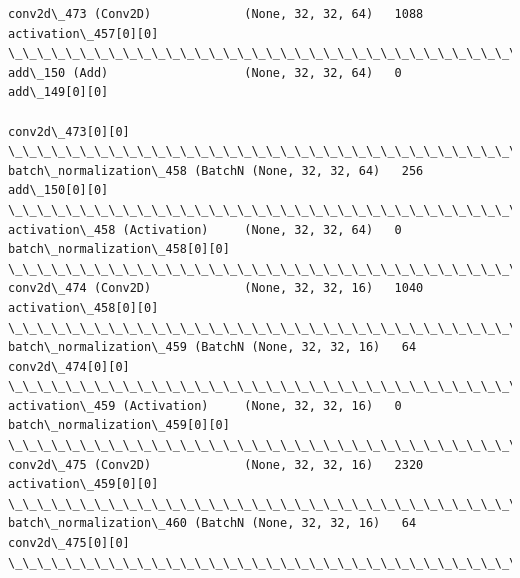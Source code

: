 \documentclass[11pt]{article}
\begin{document}
\begin{Verbatim}[commandchars=\\\{\}]
conv2d\_473 (Conv2D)             (None, 32, 32, 64)   1088        activation\_457[0][0]             
\_\_\_\_\_\_\_\_\_\_\_\_\_\_\_\_\_\_\_\_\_\_\_\_\_\_\_\_\_\_\_\_\_\_\_\_\_\_\_\_\_\_\_\_\_\_\_\_\_\_\_\_\_\_\_\_\_\_\_\_\_\_\_\_\_\_\_\_\_\_\_\_\_\_\_\_\_\_\_\_\_\_\_\_\_\_\_\_\_\_\_\_\_\_\_\_\_\_
add\_150 (Add)                   (None, 32, 32, 64)   0           add\_149[0][0]                    
                                                                 conv2d\_473[0][0]                 
\_\_\_\_\_\_\_\_\_\_\_\_\_\_\_\_\_\_\_\_\_\_\_\_\_\_\_\_\_\_\_\_\_\_\_\_\_\_\_\_\_\_\_\_\_\_\_\_\_\_\_\_\_\_\_\_\_\_\_\_\_\_\_\_\_\_\_\_\_\_\_\_\_\_\_\_\_\_\_\_\_\_\_\_\_\_\_\_\_\_\_\_\_\_\_\_\_\_
batch\_normalization\_458 (BatchN (None, 32, 32, 64)   256         add\_150[0][0]                    
\_\_\_\_\_\_\_\_\_\_\_\_\_\_\_\_\_\_\_\_\_\_\_\_\_\_\_\_\_\_\_\_\_\_\_\_\_\_\_\_\_\_\_\_\_\_\_\_\_\_\_\_\_\_\_\_\_\_\_\_\_\_\_\_\_\_\_\_\_\_\_\_\_\_\_\_\_\_\_\_\_\_\_\_\_\_\_\_\_\_\_\_\_\_\_\_\_\_
activation\_458 (Activation)     (None, 32, 32, 64)   0           batch\_normalization\_458[0][0]    
\_\_\_\_\_\_\_\_\_\_\_\_\_\_\_\_\_\_\_\_\_\_\_\_\_\_\_\_\_\_\_\_\_\_\_\_\_\_\_\_\_\_\_\_\_\_\_\_\_\_\_\_\_\_\_\_\_\_\_\_\_\_\_\_\_\_\_\_\_\_\_\_\_\_\_\_\_\_\_\_\_\_\_\_\_\_\_\_\_\_\_\_\_\_\_\_\_\_
conv2d\_474 (Conv2D)             (None, 32, 32, 16)   1040        activation\_458[0][0]             
\_\_\_\_\_\_\_\_\_\_\_\_\_\_\_\_\_\_\_\_\_\_\_\_\_\_\_\_\_\_\_\_\_\_\_\_\_\_\_\_\_\_\_\_\_\_\_\_\_\_\_\_\_\_\_\_\_\_\_\_\_\_\_\_\_\_\_\_\_\_\_\_\_\_\_\_\_\_\_\_\_\_\_\_\_\_\_\_\_\_\_\_\_\_\_\_\_\_
batch\_normalization\_459 (BatchN (None, 32, 32, 16)   64          conv2d\_474[0][0]                 
\_\_\_\_\_\_\_\_\_\_\_\_\_\_\_\_\_\_\_\_\_\_\_\_\_\_\_\_\_\_\_\_\_\_\_\_\_\_\_\_\_\_\_\_\_\_\_\_\_\_\_\_\_\_\_\_\_\_\_\_\_\_\_\_\_\_\_\_\_\_\_\_\_\_\_\_\_\_\_\_\_\_\_\_\_\_\_\_\_\_\_\_\_\_\_\_\_\_
activation\_459 (Activation)     (None, 32, 32, 16)   0           batch\_normalization\_459[0][0]    
\_\_\_\_\_\_\_\_\_\_\_\_\_\_\_\_\_\_\_\_\_\_\_\_\_\_\_\_\_\_\_\_\_\_\_\_\_\_\_\_\_\_\_\_\_\_\_\_\_\_\_\_\_\_\_\_\_\_\_\_\_\_\_\_\_\_\_\_\_\_\_\_\_\_\_\_\_\_\_\_\_\_\_\_\_\_\_\_\_\_\_\_\_\_\_\_\_\_
conv2d\_475 (Conv2D)             (None, 32, 32, 16)   2320        activation\_459[0][0]             
\_\_\_\_\_\_\_\_\_\_\_\_\_\_\_\_\_\_\_\_\_\_\_\_\_\_\_\_\_\_\_\_\_\_\_\_\_\_\_\_\_\_\_\_\_\_\_\_\_\_\_\_\_\_\_\_\_\_\_\_\_\_\_\_\_\_\_\_\_\_\_\_\_\_\_\_\_\_\_\_\_\_\_\_\_\_\_\_\_\_\_\_\_\_\_\_\_\_
batch\_normalization\_460 (BatchN (None, 32, 32, 16)   64          conv2d\_475[0][0]                 
\_\_\_\_\_\_\_\_\_\_\_\_\_\_\_\_\_\_\_\_\_\_\_\_\_\_\_\_\_\_\_\_\_\_\_\_\_\_\_\_\_\_\_\_\_\_\_\_\_\_\_\_\_\_\_\_\_\_\_\_\_\_\_\_\_\_\_\_\_\_\_\_\_\_\_\_\_\_\_\_\_\_\_\_\_\_\_\_\_\_\_\_\_\_\_\_\_\_

\end{Verbatim}
\end{document}
